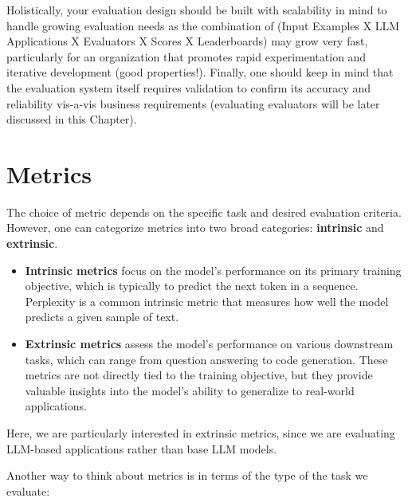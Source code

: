 Holistically, your evaluation design should be built with scalability in mind to handle growing evaluation needs as the combination of (Input Examples X LLM Applications X Evaluators X Scores X Leaderboards) may grow very fast, particularly for an organization that promotes rapid experimentation and iterative development (good properties!). Finally, one should keep in mind that the evaluation system itself requires validation to confirm its accuracy and reliability vis-a-vis business requirements (evaluating evaluators will be later discussed in this Chapter).
\section{Metrics}

The choice of metric depends on the specific task and desired evaluation criteria. However, one can categorize metrics into two broad categories: \textbf{intrinsic} and \textbf{extrinsic}.

\begin{itemize}
    \item \textbf{Intrinsic metrics} focus on the model's performance on its primary training objective, which is typically to predict the next token in a sequence. Perplexity is a common intrinsic metric that measures how well the model predicts a given sample of text.

    \item \textbf{Extrinsic metrics} assess the model's performance on various downstream tasks, which can range from question answering to code generation. These metrics are not directly tied to the training objective, but they provide valuable insights into the model's ability to generalize to real-world applications.
\end{itemize}

Here, we are particularly interested in extrinsic metrics, since we are evaluating LLM-based applications rather than base LLM models.

Another way to think about metrics is in terms of the type of the task we evaluate:

